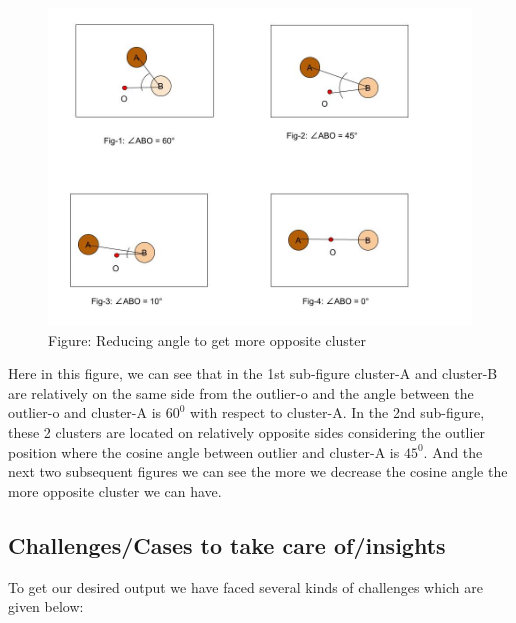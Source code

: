 \documentclass[11pt]{article}
\theoremstyle{definition}
\begin{document}
\begin{figure}[H]
\centering
\includegraphics[scale=.5]{images/Opposite-cluster.jpg}\\
Figure: Reducing angle to get more opposite cluster
\end{figure}
\noindent Here in this figure, we can see that in the 1st sub-figure cluster-A and cluster-B are relatively on the same side from the outlier-o and the angle between the outlier-o and cluster-A is $60^0$ with respect to cluster-A. In the 2nd sub-figure, these 2 clusters are located on relatively opposite sides considering the outlier position where the cosine angle between outlier and cluster-A is $45^0$. And the next two subsequent figures we can see the more we decrease the cosine angle the more opposite cluster we can have.

\subsection{Challenges/Cases to take care of/insights}
To get our desired output we have faced several kinds of challenges which are given below:
\end{document}
